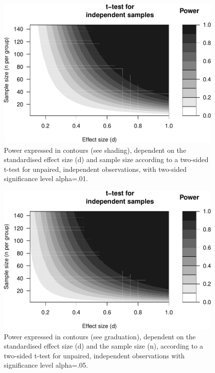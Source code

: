 \documentclass[
]{book}
\begin{document}
\begin{figure}
\centering
\includegraphics{QMS-EN_files/figure-latex/powercontours-alpha01-1.pdf}
\caption{\label{fig:powercontours-alpha01}Power expressed in contours (see shading), dependent on the standardised effect size (d) and sample size according to a two-sided t-test for unpaired, independent observations, with two-sided significance level alpha=.01.}
\end{figure}

\begin{figure}
\centering
\includegraphics{QMS-EN_files/figure-latex/powercontours-alpha05-1.pdf}
\caption{\label{fig:powercontours-alpha05}Power expressed in contours (see graduation), dependent on the standardised effect size (d) and the sample size (n), according to a two-sided t-test for unpaired, independent observations with significance level alpha=.05.}
\end{figure}
\end{document}
